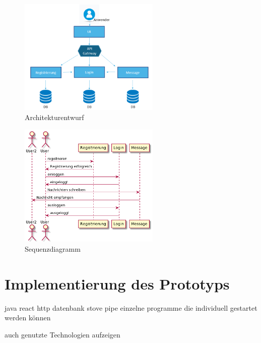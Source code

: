 \begin{figure}[bth] 
	\centering
	\includegraphics[width=0.6\textwidth]{Graphics/Architekturentwurf.png}
	\caption{Architekturentwurf}
\end{figure}

\begin{figure}[bth] 
	\centering
	\includegraphics[width=0.6\textwidth]{Graphics/Sequenzdiagramm.png}
	\caption{Sequenzdiagramm}
\end{figure}

\section{Implementierung des Prototyps}
java
react
http
datenbank
stove pipe
einzelne programme die individuell gestartet werden können

auch genutzte Technologien aufzeigen

